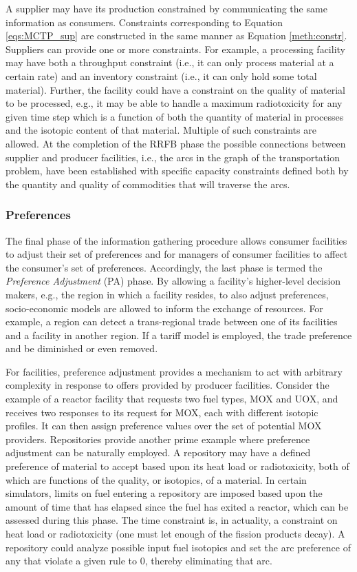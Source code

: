 A supplier may have its production constrained by communicating the same
information as consumers. Constraints corresponding to Equation
\ref{eqs:MCTP_sup} are constructed in the same manner as Equation
\ref{meth:constr}. Suppliers can provide one or more constraints. For example, a
processing facility may have both a throughput constraint (i.e., it can only
process material at a certain rate) and an inventory constraint (i.e., it can
only hold some total material). Further, the facility could have a constraint on
the quality of material to be processed, e.g., it may be able to handle a
maximum radiotoxicity for any given time step which is a function of both the
quantity of material in processes and the isotopic content of that
material. Multiple of such constraints are allowed. At the completion of the
RRFB phase the possible connections between supplier and producer facilities,
i.e., the arcs in the graph of the transportation problem, have been established
with specific capacity constraints defined both by the quantity and quality of
commodities that will traverse the arcs.

\subsubsection{Preferences}

The final phase of the information gathering procedure allows consumer
facilities to adjust their set of preferences and for managers of consumer
facilities to affect the consumer's set of preferences. Accordingly, the last
phase is termed the \textit{Preference Adjustment} (PA) phase. By allowing a
facility's higher-level decision makers, e.g., the region in which a facility
resides, to also adjust preferences, socio-economic models are allowed to inform
the exchange of resources. For example, a region can detect a trans-regional
trade between one of its facilities and a facility in another region. If a
tariff model is employed, the trade preference and be diminished or even
removed.

For facilities, preference adjustment provides a mechanism to act with arbitrary
complexity in response to offers provided by producer facilities. Consider the
example of a reactor facility that requests two fuel types, MOX and UOX, and
receives two responses to its request for MOX, each with different isotopic
profiles. It can then assign preference values over the set of potential MOX
providers. Repositories provide another prime example where preference
adjustment can be naturally employed. A repository may have a defined preference
of material to accept based upon its heat load or radiotoxicity, both of which
are functions of the quality, or isotopics, of a material. In certain
simulators, limits on fuel entering a repository are imposed based upon the
amount of time that has elapsed since the fuel has exited a reactor, which can
be assessed during this phase. The time constraint is, in actuality, a
constraint on heat load or radiotoxicity (one must let enough of the fission
products decay). A repository could analyze possible input fuel isotopics and
set the arc preference of any that violate a given rule to 0, thereby
eliminating that arc.

